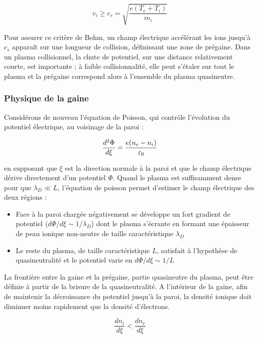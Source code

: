 \begin{refsection}
\begin{equation}
v_i\ge c_s=\sqrt{\frac{e (T_{e}+T_{i})}{m_{i}}}
\end{equation}

Pour assurer ce critère de Bohm, un champ électrique accélérant les ions
jusqu'à $c_s$ apparaît sur une longueur de collision, définissant une zone de
prégaine.
Dans un plasma collisionnel, la chute de potentiel, sur une distance
relativement courte, est importante ; à faible collisionnalité, elle
peut s'étaler sur tout le plasma et la prégaine correspond alors à l'ensemble du
plasma quasineutre.


\subsubsection{Physique de la gaine}
\label{1-gaine}
Considérons de nouveau l'équation de Poisson, qui contrôle l'évolution du
potentiel électrique, au voisinage de la paroi :

\begin{equation}
\frac{d^{{2}}\Phi}{d\xi}=\frac{e(n_{e}-n_{i})}{\varepsilon{_{0}}}
\end{equation}

 en supposant que $\xi$ est la
 direction normale à la paroi et que le champ électrique dérive directement
 d'un potentiel $\Phi$.
 Quand le plasma est suffisamment dense pour que $\lambda_D\ll L$, l'équation de poisson permet
 d'estimer le champ électrique des deux régions :

 \begin{itemize}
   \item Face à la paroi chargée négativement se
   développe un fort gradient de potentiel ($d\Phi/d\xi\sim 1/\lambda_D$) dont le plasma
   s'écrante en formant une épaisseur de peau ionique non-neutre de
   taille caractéristique $\lambda_D$
   \item Le reste du plasma, de taille caractéristique $L$, satisfait
   à l'hypothèse de quasineutralité et le potentiel varie en
   $d\Phi/d\xi\sim1/L$
 \end{itemize}

La frontière entre la gaine et la prégaine, partie quasineutre du plasma, peut
être définie à partir de la brisure de la quasineutralité. A l'intérieur de la
gaine, afin de maintenir la décroissance du potentiel jusqu'à la paroi, la
densité ionique doit diminuer moins rapidement que la densité d'électrons.
 
\begin{equation}
	\frac{dn_{i}}{d\xi}<\frac{dn_{e}}{d\xi}
\end{equation}


\end{refsection}

